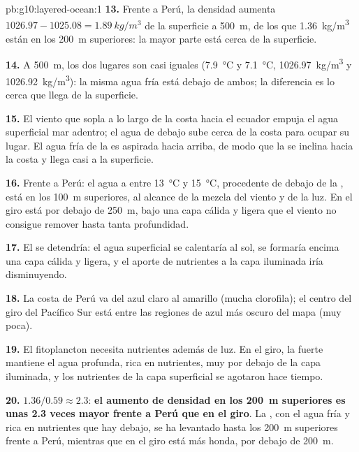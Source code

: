 \begin{solution}{pb:g10:layered-ocean:1}
\textbf{13.} Frente a Perú, la densidad aumenta $1026.97 - 1025.08 =
\qty{1.89}{kg/m^3}$ de la superficie a \qty{500}{m}, de los que
\qty{1.36}{kg/m^3} están en los \qty{200}{m} superiores: la mayor parte está
cerca de la superficie.

\textbf{14.} A \qty{500}{m}, los dos lugares son casi iguales
(\qty{7.9}{\degreeCelsius} y \qty{7.1}{\degreeCelsius},
\qty{1026.97}{kg/m^3} y \qty{1026.92}{kg/m^3}): la misma agua fría está
debajo de ambos; la diferencia es lo cerca que llega de la superficie.

\textbf{15.} El viento que sopla a lo largo de la costa hacia el ecuador
empuja el agua superficial mar adentro; el agua de debajo sube cerca de la
costa para ocupar su lugar. El agua fría de la  es aspirada hacia
arriba, de modo que la  se inclina hacia la costa y llega casi a la
superficie.

\textbf{16.} Frente a Perú: el agua a entre \qty{13}{\degreeCelsius} y
\qty{15}{\degreeCelsius}, procedente de debajo de la , está en los
\qty{100}{m} superiores, al alcance de la mezcla del viento y de la luz. En el
giro está por debajo de \qty{250}{m}, bajo una capa cálida y ligera que el
viento no consigue remover hasta tanta profundidad.

\textbf{17.} El  se detendría: el agua superficial se calentaría
al sol, se formaría encima una capa cálida y ligera, y el aporte de
nutrientes a la capa iluminada iría disminuyendo.

\textbf{18.} La costa de Perú va del azul claro al amarillo (mucha
clorofila); el centro del giro del Pacífico Sur está entre las regiones de
azul más oscuro del mapa (muy poca).

\textbf{19.} El fitoplancton necesita nutrientes además de luz. En el giro,
la fuerte  mantiene el agua profunda, rica en nutrientes, muy
por debajo de la capa iluminada, y los nutrientes de la capa superficial se
agotaron hace tiempo.

\textbf{20.} $1.36/0.59 \approx 2.3$: \textbf{el aumento de densidad en los
\qty{200}{m} superiores es unas 2.3 veces mayor frente a Perú que en el
giro}. La , con el agua fría y rica en nutrientes que hay debajo,
se ha levantado hasta los \qty{200}{m} superiores frente a Perú, mientras que
en el giro está más honda, por debajo de \qty{200}{m}.
\end{solution}
